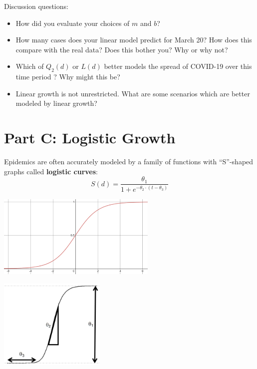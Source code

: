 \documentclass[11pt,reqno,final]{amsart}
\numberwithin{equation}{section}
\numberwithin{figure}{section}
\theoremstyle{definition} %
\begin{document}
\begin{enumerate}[(1)]
        Discussion questions:
        \begin{itemize}
        \item How did you evaluate your choices of $m$ and $b$?
        \item How many cases does your linear model predict for March 20? How does this compare with the real data? Does this bother you? Why or why not?
        \item Which of $Q_2(d)$ or $L(d)$ better models the spread of COVID-19 over this time period ? Why might this be?
        \item Linear growth is not unrestricted. What are some scenarios which are better modeled by linear growth?
        \end{itemize}
\end{enumerate}

\newpage
\section*{Part C: Logistic Growth}

Epidemics are often accurately modeled by a family of functions with ``S''-shaped graphs called \textbf{logistic curves}:
\[
        S(d) = \dfrac{\theta_1}{1 + e^{-\theta_2 \cdot (t - \theta_3)}}
\]
\begin{minipage}{.5\textwidth}
        \begin{center}
                \includegraphics[width=3in]{logistic}
        \end{center}
\end{minipage}
\begin{minipage}{.5\textwidth}
        \begin{center}
                \includegraphics[width=2in]{logparams}
        \end{center}
\end{minipage}
\end{document}
